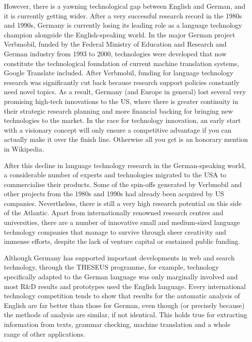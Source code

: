 \begin{multicols}{2}
However, there is a yawning technological gap between English and German, and it is currently getting wider. After a very successful research record in the 1980s and 1990s, Germany is currently losing its leading role as a language technology champion alongside the English-speaking world. In the major German project Verbmobil, funded by the Federal Ministry of Education and Research and German industry from 1993 to 2000, technologies were developed that now constitute the technological foundation of current machine translation systems, Google Translate included. After Verbmobil, funding for language technology research was significantly cut back because research support policies constantly need novel topics. As a result, Germany (and Europe in general) lost several very promising high-tech innovations to the US, where there is greater continuity in their strategic research planning and more financial backing for bringing new technologies to the market. In the race for technology innovation, an early start with a visionary concept will only ensure a competitive advantage if you can actually make it over the finish line. Otherwise all you get is an honorary mention in Wikipedia.

After this decline in language technology research in the German-speaking world, a considerable number of experts and technologies migrated to the USA to commercialise their products. Some of the spin-offs generated by Verbmobil and other projects from the 1980s and 1990s had already been acquired by US companies. Nevertheless, there is still a very high research potential on this side of the Atlantic. Apart from internationally renowned research centres and universities, there are a number of innovative small and medium-sized language technology companies that manage to survive through sheer creativity and immense efforts, despite the lack of venture capital or sustained public funding.

Although Germany has supported important developments in web and search technology, through the THESEUS programme, for example, technology specifically adapted to the German language was only marginally involved and most R\&D results and prototypes used the English language.
Every international technology competition tends to show that results for the automatic analysis of English are far better than those for German, even though (or precisely because) the methods of analysis are similar, if not identical. This holds true for extracting information from texts, grammar checking, machine translation and a whole range of other applications.


\end{multicols}
